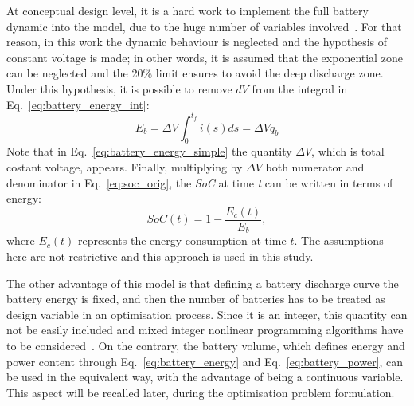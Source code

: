 At conceptual design level, it is a hard work to implement the full battery dynamic into the model, due to the huge number of variables involved~\cite{bib:tremblay}.
For that reason, in this work the dynamic behaviour is neglected and the hypothesis of constant voltage is made; in other words, it is assumed that the exponential zone can be neglected and the 20\% limit ensures to avoid the deep discharge zone.
Under this hypothesis, it is possible to remove $dV$ from the integral in Eq.~\eqref{eq:battery_energy_int}:
\begin{equation}
\label{eq:battery_energy_simple}
E_b = \Delta V \int_{0}^{t_{f}} i\left(s\right)ds = \Delta V q_b
\end{equation}
Note that in Eq.~\eqref{eq:battery_energy_simple} the quantity $\Delta V$, which is total costant voltage, appears. 
Finally, multiplying by $\Delta V$ both numerator and denominator in Eq.~\eqref{eq:soc_orig}, the \textit{SoC} at time \textit{t} can be written in terms of energy:
\begin{equation}
\label{eq:soc}
SoC\left(t\right) = 1 - \frac{E_{c}\left(t\right)}{E_{b}},
\end{equation}
where $E_{c}\left(t\right)$ represents the energy consumption at time $t$.
The assumptions here are not restrictive and this approach is used in this study.

The other advantage of this model is that defining a battery discharge curve the battery energy is fixed, and then the number of batteries has to be treated as design variable in an optimisation process.
Since it is an integer, this quantity can not be easily included and mixed integer nonlinear programming algorithms have to be considered~\cite{bib:belotti}.
On the contrary, the battery volume, which defines energy and power content through Eq.~\eqref{eq:battery_energy} and Eq.~\eqref{eq:battery_power}, can be used in the equivalent way, with the advantage of being a continuous variable. 
This aspect will be recalled later, during the optimisation problem formulation. 

